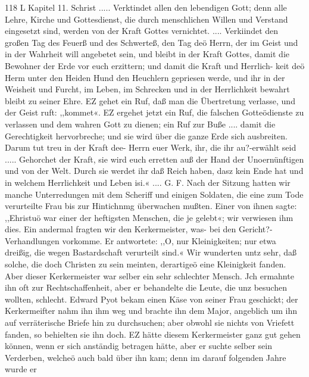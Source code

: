 118 L Kapitel 11.
Schrist ..... Verktindet allen den lebendigen Gott; denn alle
Lehre, Kirche und Gottesdienst, die durch menschlichen Willen und
Verstand eingesetzt sind, werden von der Kraft Gottes vernichtet.
.... Verkiindet den großen Tag des Feuerß und des Schwerteß,
den Tag deö Herrn, der im Geist und in der Wahrheit will
angebetet sein, und bleibt in der Kraft Gottes, damit die Bewohner
der Erde vor euch erzittern; und damit die Kraft und Herrlich-
keit deö Herm unter den Heiden Hund den Heuchlern gepriesen
werde, und ihr in der Weisheit und Furcht, im Leben, im Schrecken
und in der Herrlichkeit bewahrt bleibt zu seiner Ehre. EZ gehet
ein Ruf, daß man die Übertretung verlasse, und der Geist ruft:
,,kommet«. EZ ergehet jetzt ein Ruf, die falschen Gotteödienste
zu verlassen und dem wahren Gott zu dienen; ein Ruf zur
Buße .... damit die Gerechtigkeit hervorbreche; und sie wird
über die ganze Erde sich ausbreiten. Darum tut treu in der
Kraft dee- Herrn euer Werk, ihr, die ihr au?-erwählt seid .....
Gehorchet der Kraft, sie wird euch erretten auß der Hand der
Unoernünftigen und von der Welt. Durch sie werdet ihr daß
Reich haben, dasz kein Ende hat und in welchem Herrlichkeit und
Leben isi.« .... G. F.
Nach der Sitzung hatten wir manche Unterredungen mit dem
Scheriff und einigen Soldaten, die eine zum Tode verurteilte Frau
bis zur Hintichnmg überwachen mußten. Einer von ihnen sagte:
,,Ehristuö war einer der heftigsten Menschen, die je gelebt«; wir
verwiesen ihm dies. Ein andermal fragten wir den Kerkermeister,
was- bei den Gericht?-Verhandlungen vorkomme. Er antwortete:
,,O, nur Kleinigkeiten; nur etwa dreißig, die wegen Bastardschaft
verurteilt sind.« Wir wunderten untz sehr, daß solche, die doch
Christen zu sein meinten, derartigeö eine Kleinigkeit fanden.
Aber dieser Kerkermeister war selber ein sehr schlechter Mensch.
Jch ermahnte ihn oft zur Rechtschaffenheit, aber er behandelte
die Leute, die unz besuchen wollten, schlecht. Edward Pyot bekam
einen Käse von seiner Frau geschickt; der Kerkermeifter nahm ihn
ihm weg und brachte ihn dem Major, angeblich um ihn auf
verräterische Briefe hin zu durchsuchen; aber obwohl sie nichts
von Vriefett fanden, so behielten sie ihn doch. EZ hätte diesem
Kerkermeister ganz gut gehen können, wenn er sich anständig
betragen hätte, aber er suchte selber sein Verderben, welcheö auch
bald über ihn kam; denn im darauf folgenden Jahre wurde er


